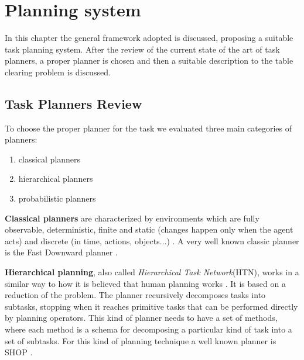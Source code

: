 \chapter{Planning system}
\label{ch:planning_system}
In this chapter the general framework adopted is discussed, proposing a suitable task planning system. After the  review of the current state of the art of task planners, a proper planner is chosen and then a suitable description to the table clearing problem is discussed.
\section{Task Planners Review}
To choose the proper planner for the task we evaluated three main categories of planners:
\begin{enumerate}
\item classical planners\DM{,}
\item hierarchical planners\DM{,}
\item probabilistic planners
\end{enumerate}
\textbf{Classical planners} are characterized by environments which are fully observable, deterministic, finite and static (changes happen only when the agent acts) and discrete (in time, actions, objects...) \citep{artificialIntelligence}.  A very well known classic planner is the Fast Downward planner \cite{helmert2006fast}.


\textbf{Hierarchical planning}, also called \textit{Hierarchical Task Network}(HTN), works in a similar way to how it is believed that human planning 
works \citep{marthi2007angelic}. It is based on a reduction of the problem. The planner recursively decomposes tasks into subtasks, stopping when it reaches primitive tasks that can be performed directly by planning operators. This kind of planner needs to have a set of methods, where each method is a schema for decomposing a particular kind of task into a set of subtasks. For this kind of planning technique a well known planner is SHOP \citep{shop}.

